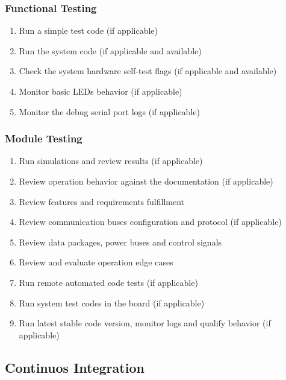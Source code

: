 \subsubsection{Functional Testing}
\begin{enumerate} \setlength\itemsep{-0.3em}
    \item Run a simple test code (if applicable) 
    \item Run the system code (if applicable and available) 
    \item Check the system hardware self-test flags (if applicable and available) 
    \item Monitor basic LEDs behavior (if applicable) 
    \item Monitor the debug serial port logs (if applicable)
\end{enumerate}

\subsubsection{Module Testing}
\begin{enumerate} \setlength\itemsep{-0.3em}
    \item Run simulations and review results (if applicable)
    \item Review operation behavior against the documentation (if applicable)
    \item Review features and requirements fulfillment
    \item Review communication buses configuration and protocol (if applicable)
    \item Review data packages, power buses and control signals
    \item Review and evaluate operation edge cases
    \item Run remote automated code tests (if applicable)
    \item Run system test codes in the board (if applicable)
    \item Run latest stable code version, monitor logs and qualify behavior (if applicable)
\end{enumerate}

\subsection{Continuos Integration}


